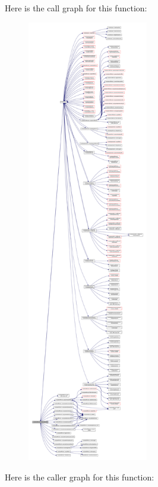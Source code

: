 Here is the call graph for this function\+:\nopagebreak
\begin{figure}[H]
\begin{center}
\leavevmode
\includegraphics[height=550pt]{namespacemodulewrfformat_aa35fbb60f9455409be248675ba032799_cgraph}
\end{center}
\end{figure}
Here is the caller graph for this function\+:\nopagebreak
